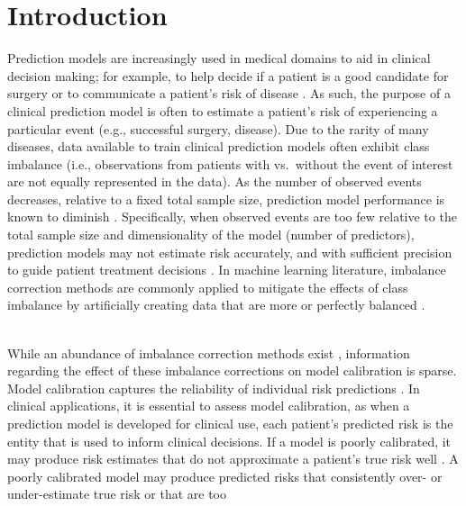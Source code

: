 \documentclass[AMA,STIX1COL,]{WileyNJD-v2}
\begin{document}
\maketitle

\hypertarget{introduction}{%
\section{Introduction}\label{introduction}}

Prediction models are increasingly used in medical domains to aid in
clinical decision making; for example, to help decide if a patient is a
good candidate for surgery or to communicate a patient's risk of disease
\citep{ewout_intro, annals, achilles}. As such, the purpose of a
clinical prediction model is often to estimate a patient's risk of
experiencing a particular event (e.g., successful surgery, disease). Due
to the rarity of many diseases, data available to train clinical
prediction models often exhibit class imbalance (i.e., observations from
patients with vs.~without the event of interest are not equally
represented in the data). As the number of observed events decreases,
relative to a fixed total sample size, prediction model performance is
known to diminish \citep{maartens_paper}. Specifically, when observed
events are too few relative to the total sample size and dimensionality
of the model (number of predictors), prediction models may not estimate
risk accurately, and with sufficient precision to guide patient
treatment decisions \citep{maartens_paper, newpaper}. In machine
learning literature, imbalance correction methods are commonly applied
to mitigate the effects of class imbalance by artificially creating data
that are more or perfectly balanced
\citep{cip, summary_m, lp, summary_h}.\\
\strut \\
While an abundance of imbalance correction methods exist
\citep{summary_m, lp, summary_h}, information regarding the effect of
these imbalance corrections on model calibration is sparse. Model
calibration captures the reliability of individual risk predictions
\citep{achilles}. In clinical applications, it is essential to assess
model calibration, as when a prediction model is developed for clinical
use, each patient's predicted risk is the entity that is used to inform
clinical decisions. If a model is poorly calibrated, it may produce risk
estimates that do not approximate a patient's true risk well
\citep{achilles}. A poorly calibrated model may produce predicted risks
that consistently over- or under-estimate true risk or that are too
\end{document}
